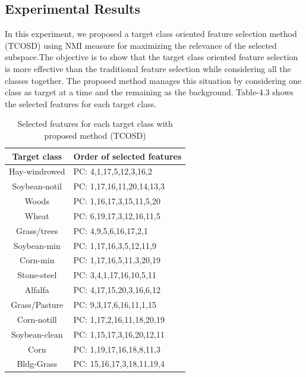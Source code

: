 \documentclass[document.tex]{subfiles}
\begin{document}
\subsection{Experimental Results}
In this experiment, we proposed a target class oriented feature selection method (TCOSD) using NMI measure for maximizing the relevance of the selected subspace.The objective is to show that the target class oriented feature selection is more effective than the traditional feature selection while considering all the classes together. The proposed method manages this situation by considering one class as target at a time and the remaining as the background. Table-4.3 shows the selected features for each target class. 
\begin{table}[H]
	\caption{Selected features for each target class with proposed method (TCOSD)}
	\begin{center}
		\begin{tabular}{|c|l|}
			\hline
			Target class & Order of selected features\\ \hline
			Hay-windrowed & PC: 4,1,17,5,12,3,16,2\\ \hline
			Soybean-notil & PC: 1,17,16,11,20,14,13,3\\ \hline
			Woods & PC: 1,16,17,3,15,11,5,20\\ \hline
			Wheat & PC: 6,19,17,3,12,16,11,5\\ \hline
			Grass/trees & PC: 4,9,5,6,16,17,2,1\\ \hline
			Soybean-min & PC: 1,17,16,3,5,12,11,9\\ \hline
			Corn-min & PC: 1,17,16,5,11,3,20,19\\ \hline
			Stone-steel & PC: 3,4,1,17,16,10,5,11\\ \hline
			Alfalfa & PC: 4,17,15,20,3,16,6,12\\ \hline
			Grass/Pasture & PC: 9,3,17,6,16,11,1,15\\ \hline
			Corn-notill & PC: 1,17,2,16,11,18,20,19\\ \hline
			Soybean-clean & PC: 1,15,17,3,16,20,12,11\\ \hline
			Corn & PC: 1,19,17,16,18,8,11,3\\ \hline
			Bldg-Grass & PC: 15,16,17,3,18,11,19,4\\ \hline
		\end{tabular}
	\end{center}
	\label{tab:Selected features for each target class with proposed method (TCOSD)}
\end{table}
\end{document}
